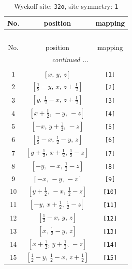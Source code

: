 \documentclass[fleqn,8pt]{jsarticle}
\begin{document}
\renewcommand{\arraystretch}{1.2}
\begin{longtable}{ccc}
\caption{Wyckoff site: {\tt 32o}, site symmetry: {\tt 1}}
 \\
 \hline \hline
No. & position & mapping \\ \hline \endfirsthead

\multicolumn{2}{l}{\tablename\ \thetable{}} \\
 \hline \hline
No. & position & mapping \\ \hline \endhead

 \hline \hline
\multicolumn{2}{r}{\footnotesize\it continued ...} \\ \endfoot

 \hline \hline
\multicolumn{2}{r}{} \\ \endlastfoot

1 & $\left[ x,\, y,\, z \right]$ & {\tt [1]} \\ \hline
2 & $\left[ \frac{1}{2} - y,\, x,\, z + \frac{1}{2} \right]$ & {\tt [2]} \\ \hline
3 & $\left[ y,\, \frac{1}{2} - x,\, z + \frac{1}{2} \right]$ & {\tt [3]} \\ \hline
4 & $\left[ x + \frac{1}{2},\, - y,\, - z \right]$ & {\tt [4]} \\ \hline
5 & $\left[ - x,\, y + \frac{1}{2},\, - z \right]$ & {\tt [5]} \\ \hline
6 & $\left[ \frac{1}{2} - x,\, \frac{1}{2} - y,\, z \right]$ & {\tt [6]} \\ \hline
7 & $\left[ y + \frac{1}{2},\, x + \frac{1}{2},\, \frac{1}{2} - z \right]$ & {\tt [7]} \\ \hline
8 & $\left[ - y,\, - x,\, \frac{1}{2} - z \right]$ & {\tt [8]} \\ \hline
9 & $\left[ - x,\, - y,\, - z \right]$ & {\tt [9]} \\ \hline
10 & $\left[ y + \frac{1}{2},\, - x,\, \frac{1}{2} - z \right]$ & {\tt [10]} \\ \hline
11 & $\left[ - y,\, x + \frac{1}{2},\, \frac{1}{2} - z \right]$ & {\tt [11]} \\ \hline
12 & $\left[ \frac{1}{2} - x,\, y,\, z \right]$ & {\tt [12]} \\ \hline
13 & $\left[ x,\, \frac{1}{2} - y,\, z \right]$ & {\tt [13]} \\ \hline
14 & $\left[ x + \frac{1}{2},\, y + \frac{1}{2},\, - z \right]$ & {\tt [14]} \\ \hline
15 & $\left[ \frac{1}{2} - y,\, \frac{1}{2} - x,\, z + \frac{1}{2} \right]$ & {\tt [15]} \\ \hline

\end{longtable}
\end{document}
